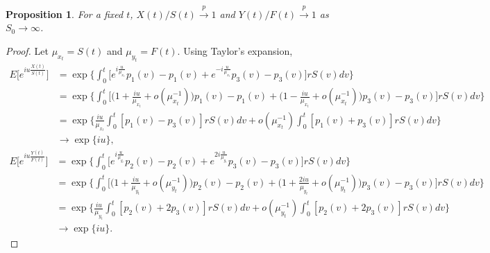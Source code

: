 \documentclass[12pt]{article}
\newtheorem{proposition}{Proposition}
\begin{document}
\begin{proposition}
For a fixed $t$, $X(t)/S(t)  \overset{p}{\to} 1$ and $Y(t)/F(t) \overset{p}{\to} 1$ as $S_0 \rightarrow \infty$.
\end{proposition}
\begin{proof}
Let $\mu_{x_t} = S(t)$ and $\mu_{y_t} = F(t)$. Using Taylor's expansion,
\begin{equation}
\begin{split}
E\Big[e^{iu \frac{X(t)}{S(t)}}\Big] & = \exp \Big\{  \int_0^t \Big[ e^{i \frac{u}{\mu_{x_t}}}p_1(v) - p_1(v) + e^{-i \frac{u}{\mu_{x_t}}}p_3(v) - p_3(v)\Big] r S(v) dv\Big\} \\
& = \exp \Big\{ \int_0^t \Big[ \Big( 1 + \frac{iu}{\mu_{x_t}}  + o(\mu^{-1}_{x_t}) \Big) p_1(v) - p_1(v)+ \Big( 1 - \frac{iu}{\mu_{x_t}}  + o(\mu^{-1}_{x_t}) \Big) p_3(v) - p_3(v)  \Big] r S(v) dv\Big\} \\
& = \exp \Big\{ \frac{iu}{\mu_{x_t}} \int_0^t  [p_1(v) - p_3(v)] r S(v) dv  +  o (\mu^{-1}_{x_t})\int_0^t [p_1(v) + p_3(v)] r S(v) dv \Big\} \\
& \rightarrow \exp \Big\{iu\Big\},
\end{split}
\end{equation}
\begin{equation}
\begin{split}
E\Big[e^{iu \frac{Y(t)}{F(t)}}\Big] & = \exp \Big\{  \int_0^t \Big[ e^{i \frac{u}{\mu_{y_t}}}p_2(v) - p_2(v) + e^{2i \frac{u}{\mu_{y_t}}}p_3(v) - p_3(v)\Big] r S(v) dv\Big\} \\
& = \exp \Big\{ \int_0^t \Big[ \Big( 1 + \frac{iu}{\mu_{y_t}}  + o(\mu^{-1}_{y_t}) \Big) p_2(v) - p_2(v)+ \Big( 1 + \frac{2iu}{\mu_{y_t}}  + o(\mu^{-1}_{y_t}) \Big) p_3(v) - p_3(v)  \Big] r S(v) dv\Big\} \\
& = \exp \Big\{ \frac{iu}{\mu_{y_t}} \int_0^t  [p_2(v) +2 p_3(v)] r S(v) dv  +  o (\mu^{-1}_{y_t})\int_0^t [p_2(v) + 2p_3(v)] r S(v) dv \Big\} \\
& \rightarrow \exp \Big\{iu\Big\}.
\end{split}
\end{equation}
\end{proof}
\end{document}
